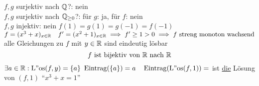 \documentclass{myclass}
\begin{document}
\begin{example}
	$ f, g $ surjektiv nach $ \mathbb{Q} $?: nein\\
	$ f, g $ surjektiv nach $ \mathbb{Q}_{\geq 0} $?: für $ g $: ja, für $ f $: nein\\
	$ f, g $ injektiv: nein $ f(1) = g(1) = g(-1) = f(-1) $\\
	$ f = ( x^3 + x )_{x \in \mathbb{R}} \quad f^{\prime} = ( x^2 + 1 )_{x \in \mathbb{R}} \implies f^{\prime} \geq 1 > 0 \implies f \text{ streng monoton wachsend} $\\
	alle Gleichungen zu $ f $ mit $ y \in \mathbb{R} $ sind eindeutig lösbar
	\[ f \text{ ist bijektiv von $ \mathbb{R} $ nach $ \mathbb{R} $} \]
	$ \exists a \in \mathbb{R} : \operatorname{L"os}(f, y) = \{ a \} $
	$ \operatorname{Eintrag}(\{ a \}) = a \quad \operatorname{Eintrag}(\operatorname{L"os}(f, 1)) = $ ist \underline{die} Lösung von $ (f, 1) $ ``$ x^3 + x = 1 $''\\[2pt]
\end{example}
\end{document}
